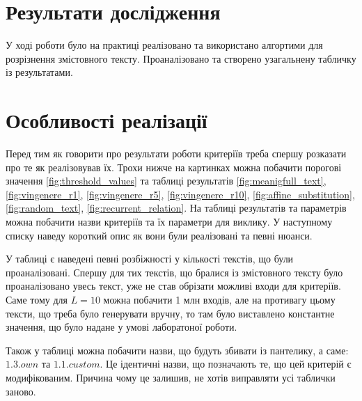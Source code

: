 \section{Результати дослідження}
У ході роботи було на практиці реалізовано та використано алгортими для розрізнення змістовного тексту. Проаналізовано та створено узагальнену табличку із результатами.

\section{Особливості реалізації}

Перед тим як говорити про результати роботи критеріїв треба спершу розказати про те як реалізовував їх.
Трохи нижче на картинках можна побачити порогові значення \ref{fig:threshold_values} та таблиці результатів \ref{fig:meanigfull_text}, \ref{fig:vingenere_r1}, \ref{fig:vingenere_r5}, \ref{fig:vingenere_r10}, \ref{fig:affine_substitution}, \ref{fig:random_text}, \ref{fig:recurrent_relation}.
На таблиці результатів та параметрів можна побачити назви критеріїв та їх параметри для виклику. У наступному списку наведу короткий опис як вони були реалізовані та певні нюанси.

\begin{remark}
    У таблиці є наведені певні розбіжності у кількості текстів, що були проаналізовані. Спершу для тих текстів, що бралися із змістовного тексту було проаналізовано увесь текст, уже не став обрізати можливі входи для критеріїв. Саме тому для $L=10$ можна побачити 1 млн входів, але на противагу цьому тексти, що треба було генерувати вручну, то там було виставлено константне значення, що було надане у умові лаборатоної роботи.
\end{remark}

\begin{remark}
    Також у таблиці можна побачити назви, що будуть збивати із пантелику, а саме: $1.3.own$ та $1.1.custom$. Це ідентичні назви, що позначають те, що цей критерій є модифікованим. Причина чому це залишив, не хотів виправляти усі таблички заново. 
\end{remark}

